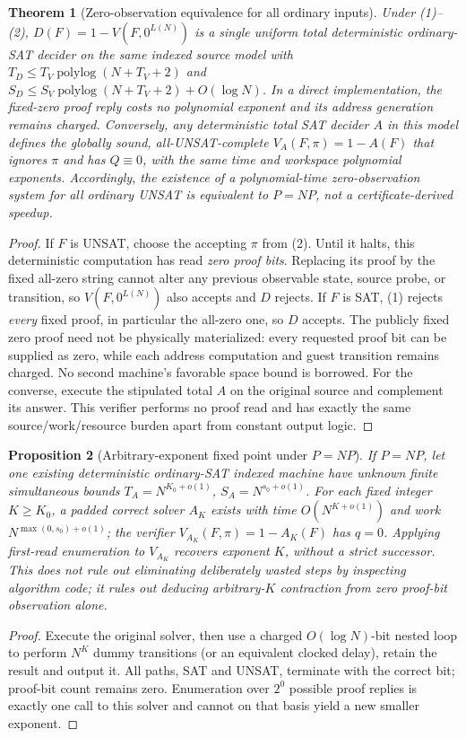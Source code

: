 \documentclass[11pt]{article}
\newtheorem{theorem}{Theorem}
\newtheorem{proposition}[theorem]{Proposition}
\begin{document}
\begin{theorem}[Zero-observation equivalence for all ordinary inputs]\label{th:zero}
Under (1)--(2), $D(F)=1-V(F,0^{L(N)})$ is a single uniform total deterministic ordinary-SAT decider on the same indexed source model with $T_D\le T_V\operatorname{polylog}(N+T_V+2)$ and $S_D\le S_V\operatorname{polylog}(N+T_V+2)+O(\log N)$. In a direct implementation, the fixed-zero proof reply costs no polynomial exponent and its address generation remains charged. Conversely, any deterministic total SAT decider $A$ in this model defines the globally sound, all-UNSAT-complete $V_A(F,\pi)=1-A(F)$ that ignores $\pi$ and has $Q\equiv0$, with the same time and workspace polynomial exponents. Accordingly, the \emph{existence} of a polynomial-time zero-observation system for all ordinary UNSAT is equivalent to $P=NP$, not a certificate-derived speedup.
\end{theorem}
\begin{proof}
If $F$ is UNSAT, choose the accepting $\pi$ from (2). Until it halts, this deterministic computation has read \emph{zero proof bits}. Replacing its proof by the fixed all-zero string cannot alter any previous observable state, source probe, or transition, so $V(F,0^{L(N)})$ also accepts and $D$ rejects. If $F$ is SAT, (1) rejects \emph{every} fixed proof, in particular the all-zero one, so $D$ accepts. The publicly fixed zero proof need not be physically materialized: every requested proof bit can be supplied as zero, while each address computation and guest transition remains charged. No second machine's favorable space bound is borrowed. For the converse, execute the stipulated total $A$ on the original source and complement its answer. This verifier performs no proof read and has exactly the same source/work/resource burden apart from constant output logic.
\end{proof}

\begin{proposition}[Arbitrary-exponent fixed point under $P=NP$]\label{pr:K}
If $P=NP$, let one existing deterministic ordinary-SAT indexed machine have unknown finite simultaneous bounds $T_A=N^{K_0+o(1)}$, $S_A=N^{s_0+o(1)}$. For each fixed integer $K\ge K_0$, a padded correct solver $A_K$ exists with time $O(N^{K+o(1)})$ and work $N^{\max(0,s_0)+o(1)}$; the verifier $V_{A_K}(F,\pi)=1-A_K(F)$ has $q=0$. Applying first-read enumeration to $V_{A_K}$ recovers exponent $K$, without a strict successor. This does not rule out eliminating deliberately wasted steps by inspecting algorithm code; it rules out deducing arbitrary-$K$ contraction from zero proof-bit observation alone.
\end{proposition}
\begin{proof}
Execute the original solver, then use a charged $O(\log N)$-bit nested loop to perform $N^K$ dummy transitions (or an equivalent clocked delay), retain the result and output it. All paths, SAT and UNSAT, terminate with the correct bit; proof-bit count remains zero. Enumeration over $2^0$ possible proof replies is exactly one call to this solver and cannot on that basis yield a new smaller exponent.
\end{proof}
\end{document}
